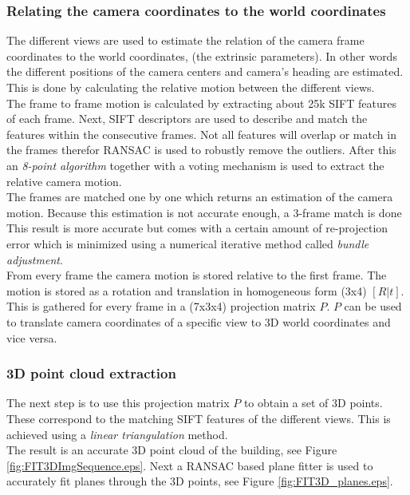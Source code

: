 \subsubsection{Relating the camera coordinates to the world coordinates}
The different views are used to estimate the relation of the camera frame
coordinates to the world coordinates, (the extrinsic parameters).  In other
words the different positions of the camera centers and camera's heading are
estimated.  This is done by calculating the relative motion between the
different views.\\

The frame to frame motion is calculated by extracting about 25k SIFT features of
each frame.  Next, SIFT descriptors are used to describe and match the features
within the consecutive frames.  Not all features will overlap or match in the
frames therefor RANSAC is used to robustly remove the outliers.  After this an
\emph{8-point algorithm} together with a voting mechanism is used to extract the
relative camera motion.\\

The frames are matched one by one which returns an estimation of the camera
motion. Because this estimation is not accurate enough, a 3-frame match is done 
This result is more accurate but comes with a certain
amount of re-projection error which is minimized using a numerical
iterative method called \emph{bundle adjustment}.  \\

From every frame the camera motion is stored relative to the first frame.
The motion is stored as a rotation and translation in homogeneous
form (3x4) $[R|t]$. This is gathered for every frame in a (7x3x4) projection matrix $P$.
$P$ can be used to translate camera coordinates of a specific view 
 to 3D world coordinates and vice versa.

\subsubsection{3D point cloud extraction}
The next step is to use this projection matrix $P$ to obtain a set of 3D points.
These correspond to the matching SIFT features of the different views.  This
is achieved using a \emph{linear triangulation} method. \\
The result is an accurate 3D point cloud of the building, see Figure
\ref{fig:FIT3DImgSequence.eps}.
Next a RANSAC based plane fitter is used to accurately fit planes through
the 3D points, see Figure \ref{fig:FIT3D_planes.eps}.\\


